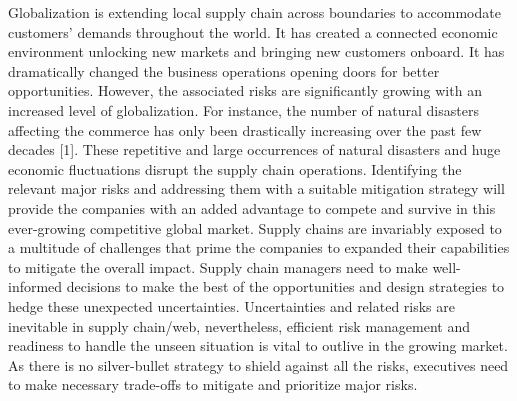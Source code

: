 \documentclass[conference]{IEEEtran}
\begin{document}
Globalization is extending local supply chain across boundaries to accommodate customers’ demands throughout the world. It has created a connected economic environment unlocking new markets and bringing new customers onboard. It has dramatically changed the business operations opening doors for better opportunities. However, the associated risks are significantly growing with an increased level of globalization. For instance, the number of natural disasters affecting the commerce has only been drastically increasing over the past few decades [1]. These repetitive and large occurrences of natural disasters and huge economic fluctuations disrupt the supply chain operations. Identifying the relevant major risks and addressing them with a suitable mitigation strategy will provide the companies with an added advantage to compete and survive in this ever-growing competitive global market. Supply chains are invariably exposed to a multitude of challenges that prime the companies to expanded their capabilities to mitigate the overall impact. Supply chain managers need to make well-informed decisions to make the best of the opportunities and design strategies to hedge these unexpected uncertainties. Uncertainties and related risks are inevitable in supply chain/web, nevertheless, efficient risk management and readiness to handle the unseen situation is vital to outlive in the growing market. As there is no silver-bullet strategy to shield against all the risks, executives need to make necessary trade-offs to mitigate and prioritize major risks.
\end{document}
